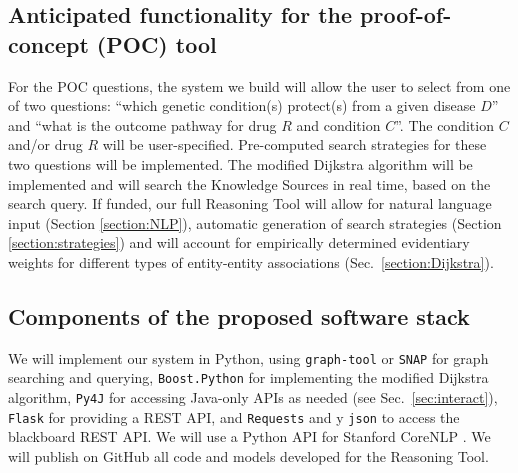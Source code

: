 \documentclass[11pt,notitlepage]{article}
\begin{document}
\subsection{Anticipated functionality for the proof-of-concept (POC) tool}
For the POC questions, the system we build will allow the user to select from
one of two questions: ``which genetic condition(s) protect(s) from a given
disease $D$'' and ``what is the outcome pathway for drug $R$ and condition
$C$''. The condition $C$ and/or drug $R$ will be user-specified. Pre-computed
search strategies for these two questions will be implemented.  The modified
Dijkstra algorithm will be implemented and will search the Knowledge Sources in
real time, based on the search query.  If funded, our full Reasoning Tool will
allow for natural language input (Section \ref{section:NLP}), automatic
generation of search strategies (Section \ref{section:strategies}) and will
account for empirically determined evidentiary weights for different types of
entity-entity associations (Sec.~\ref{section:Dijkstra}).

\subsection{Components of the proposed software stack}
We will implement our system in Python, using \verb|graph-tool|
\cite{peixoto_graph-tool_2014} or \verb|SNAP| \cite{leskovec2016snap} for graph
searching and querying, \verb|Boost.Python| \cite{boostpython} for implementing
the modified Dijkstra algorithm, \verb|Py4J| \cite{Py4J} for accessing Java-only
APIs as needed (see Sec.~\ref{sec:interact}), \verb|Flask|
\cite{grinberg2014flask} for providing a REST API, and \verb|Requests| and 
y \verb|json| to access the blackboard REST API. We
will use a Python API for Stanford CoreNLP \cite{manning2014stanford}.  We will
publish on GitHub all code and models developed for the Reasoning Tool.



\end{document}
